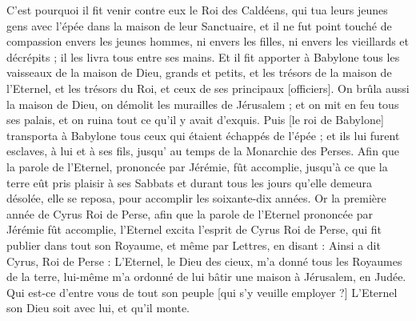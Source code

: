 \begin{multicols}{2}
C'est pourquoi il fit venir contre eux le Roi des Caldéens, qui tua leurs jeunes gens avec l'épée dans la maison de leur Sanctuaire, et il ne fut point touché de compassion envers les jeunes hommes, ni envers les filles, ni envers les vieillards et décrépits ; il les livra tous entre ses mains.
Et il fit apporter à Babylone tous les vaisseaux de la maison de Dieu, grands et petits, et les trésors de la maison de l'Eternel, et les trésors du Roi, et ceux de ses principaux [officiers].
On brûla aussi la maison de Dieu, on démolit les murailles de Jérusalem ; et on mit en feu tous ses palais, et on ruina tout ce qu'il y avait d'exquis.
Puis [le roi de Babylone] transporta à Babylone tous ceux qui étaient échappés de l'épée ; et ils lui furent esclaves, à lui et à ses fils, jusqu' au temps de la Monarchie des Perses.
Afin que la parole de l'Eternel, prononcée par Jérémie, fût accomplie, jusqu'à ce que la terre eût pris plaisir à ses Sabbats et durant tous les jours qu'elle demeura désolée, elle se reposa, pour accomplir les soixante-dix années.
Or la première année de Cyrus Roi de Perse, afin que la parole de l'Eternel prononcée par Jérémie fût accomplie, l'Eternel excita l'esprit de Cyrus Roi de Perse, qui fit publier dans tout son Royaume, et même par Lettres, en disant :
Ainsi a dit Cyrus, Roi de Perse : L'Eternel, le Dieu des cieux, m'a donné tous les Royaumes de la terre, lui-même m'a ordonné de lui bâtir une maison à Jérusalem, en Judée. Qui est-ce d'entre vous de tout son peuple [qui s'y veuille employer ?] L'Eternel son Dieu soit avec lui, et qu'il monte.
\PPE{}
\end{multicols}
